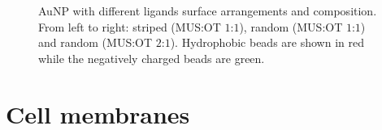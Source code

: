 \begin{figure}[!ht]
	\centering
	\qquad
	\qquad
	\caption{Au\acs{NP} with different ligands surface arrangements and composition. From left to right: striped (\ac{MUS}:\ac{OT} $1$:$1$), random (\ac{MUS}:\ac{OT} $1$:$1$) and random (\ac{MUS}:\ac{OT} $2$:$1$). Hydrophobic beads are shown in red while the negatively charged beads are green.}
	\label{fig:coating}
\end{figure}

\section{Cell membranes}

